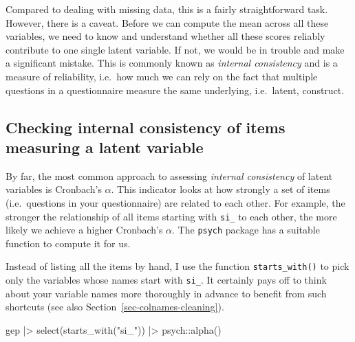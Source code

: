 \documentclass[
  letterpaper,
]{krantz}
\makeatletter
\newenvironment{Shaded}{\begin{snugshade}}{\end{snugshade}}
\newcommand{\FunctionTok}[1]{\textcolor[rgb]{0.28,0.35,0.67}{#1}}
\newcommand{\NormalTok}[1]{\textcolor[rgb]{0.00,0.23,0.31}{#1}}
\newcommand{\SpecialCharTok}[1]{\textcolor[rgb]{0.37,0.37,0.37}{#1}}
\newcommand{\StringTok}[1]{\textcolor[rgb]{0.13,0.47,0.30}{#1}}
\newenvironment{kframe}{%
\medskip{}
\setlength{\fboxsep}{.8em}
 \def\at@end@of@kframe{}%
 \ifinner\ifhmode%
  \def\at@end@of@kframe{\end{minipage}}%
  \begin{minipage}{\columnwidth}%
 \fi\fi%
 \def\FrameCommand##1{\hskip\@totalleftmargin \hskip-\fboxsep
 \colorbox{shadecolor}{##1}\hskip-\fboxsep
     \hskip-\linewidth \hskip-\@totalleftmargin \hskip\columnwidth}%
 \MakeFramed {\advance\hsize-\width
   \@totalleftmargin\z@ \linewidth\hsize
   \@setminipage}}%
 {\par\unskip\endMakeFramed%
 \at@end@of@kframe}
\renewenvironment{Shaded}{\begin{kframe}}{\end{kframe}}
\makeatother
\begin{document}
Compared to dealing with missing data, this is a fairly straightforward
task. However, there is a caveat. Before we can compute the mean across
all these variables, we need to know and understand whether all these
scores reliably contribute to one single latent variable. If not, we
would be in trouble and make a significant mistake. This is commonly
known as \emph{internal consistency} and is a measure of reliability,
i.e.~how much we can rely on the fact that multiple questions in a
questionnaire measure the same underlying, i.e.~latent, construct.

\subsection{Checking internal consistency of items measuring a latent
variable}\label{sec-internal-consistency}

By far, the most common approach to assessing \emph{internal
consistency} of latent variables is Cronbach's \(\alpha\). This
indicator looks at how strongly a set of items (i.e.~questions in your
questionnaire) are related to each other. For example, the stronger the
relationship of all items starting with \texttt{si\_} to each other, the
more likely we achieve a higher Cronbach's \(\alpha\). The
\texttt{psych} package has a suitable function to compute it for us.

Instead of listing all the items by hand, I use the function
\texttt{starts\_with()} to pick only the variables whose names start
with \texttt{si\_}. It certainly pays off to think about your variable
names more thoroughly in advance to benefit from such shortcuts (see
also Section~\ref{sec-colnames-cleaning}).

\begin{Shaded}
\begin{Highlighting}[]
\NormalTok{gep }\SpecialCharTok{|\textgreater{}}
  \FunctionTok{select}\NormalTok{(}\FunctionTok{starts\_with}\NormalTok{(}\StringTok{"si\_"}\NormalTok{)) }\SpecialCharTok{|\textgreater{}}
\NormalTok{  psych}\SpecialCharTok{::}\FunctionTok{alpha}\NormalTok{()}
\end{Highlighting}
\end{Shaded}
\end{document}
